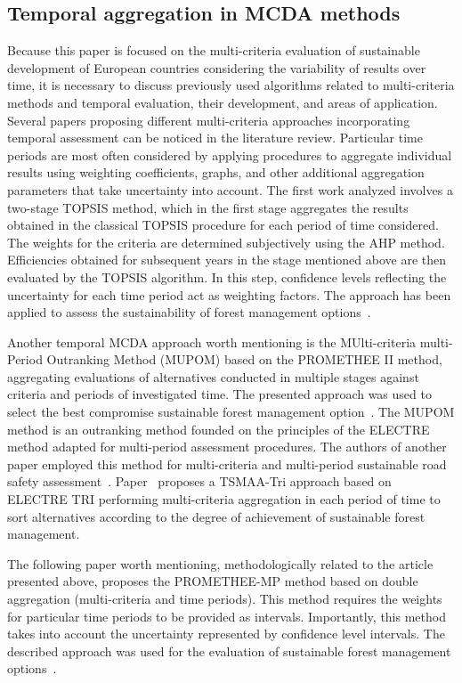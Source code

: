 \documentclass[5p,times]{elsarticle}
\begin{document}
\subsection{Temporal aggregation in MCDA methods}
\label{sec:temporalMCDA}
Because this paper is focused on the multi-criteria evaluation of sustainable development of European countries considering the variability of results over time, it is necessary to discuss previously used algorithms related to multi-criteria methods and temporal evaluation, their development, and areas of application. Several papers proposing different multi-criteria approaches incorporating temporal assessment can be noticed in the literature review. Particular time periods are most often considered by applying procedures to aggregate individual results using weighting coefficients, graphs, and other additional aggregation parameters that take uncertainty into account. The first work analyzed involves a two-stage TOPSIS method, which in the first stage aggregates the results obtained in the classical TOPSIS procedure for each period of time considered. The weights for the criteria are determined subjectively using the AHP method. Efficiencies obtained for subsequent years in the stage mentioned above are then evaluated by the TOPSIS algorithm. In this step, confidence levels reflecting the uncertainty for each time period act as weighting factors. The approach has been applied to assess the sustainability of forest management options~\cite{frini2018making}.

Another temporal MCDA approach worth mentioning is the MUlti-criteria multi-Period Outranking Method (MUPOM) based on the PROMETHEE II method, aggregating evaluations of alternatives conducted in multiple stages against criteria and periods of investigated time. The presented approach was used to select the best compromise sustainable forest management option~\cite{frini2019mupom}. The MUPOM method is an outranking method founded on the principles of the ELECTRE method adapted for multi-period assessment procedures. The authors of another paper employed this method for multi-criteria and multi-period sustainable road safety assessment~\cite{martins2021multidimensional}. Paper~\cite{mouhib2021tsmaa} proposes a TSMAA-Tri approach based on ELECTRE TRI performing multi-criteria aggregation in each period of time to sort alternatives according to the degree of achievement of sustainable forest management.

The following paper worth mentioning, methodologically related to the article presented above, proposes the PROMETHEE-MP method based on double aggregation (multi-criteria and time periods). This method requires the weights for particular time periods to be provided as intervals. Importantly, this method takes into account the uncertainty represented by confidence level intervals. The described approach was used for the evaluation of sustainable forest management options~\cite{urli2019promethee}.
\end{document}
